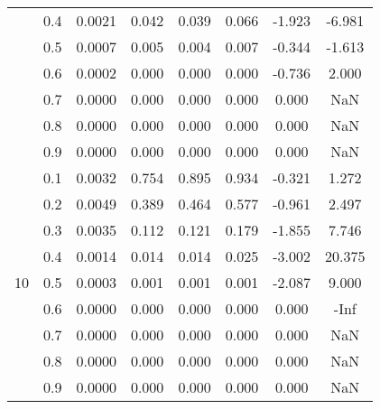 \documentclass[11pt,a4paper]{report}
\begin{document}
\begin{longtable}{ | c | c || c | c | c | c | c | c | }
 & 0.4 & 0.0021 & 0.042 & 0.039 & 0.066 & -1.923 & -6.981 \\
 & 0.5 & 0.0007 & 0.005 & 0.004 & 0.007 & -0.344 & -1.613 \\
 & 0.6 & 0.0002 & 0.000 & 0.000 & 0.000 & -0.736 & 2.000 \\
 & 0.7 & 0.0000 & 0.000 & 0.000 & 0.000 & 0.000 & NaN \\
 & 0.8 & 0.0000 & 0.000 & 0.000 & 0.000 & 0.000 & NaN \\
 & 0.9 & 0.0000 & 0.000 & 0.000 & 0.000 & 0.000 & NaN \\
 \hline
\multirow{9}{*}{10} & 0.1 & 0.0032 & 0.754 & 0.895 & 0.934 & -0.321 & 1.272 \\
 & 0.2 & 0.0049 & 0.389 & 0.464 & 0.577 & -0.961 & 2.497 \\
 & 0.3 & 0.0035 & 0.112 & 0.121 & 0.179 & -1.855 & 7.746 \\
 & 0.4 & 0.0014 & 0.014 & 0.014 & 0.025 & -3.002 & 20.375 \\
 & 0.5 & 0.0003 & 0.001 & 0.001 & 0.001 & -2.087 & 9.000 \\
 & 0.6 & 0.0000 & 0.000 & 0.000 & 0.000 & 0.000 & -Inf \\
 & 0.7 & 0.0000 & 0.000 & 0.000 & 0.000 & 0.000 & NaN \\
 & 0.8 & 0.0000 & 0.000 & 0.000 & 0.000 & 0.000 & NaN \\
 & 0.9 & 0.0000 & 0.000 & 0.000 & 0.000 & 0.000 & NaN \\
 \hline
\hline
\end{longtable}
\end{document}
